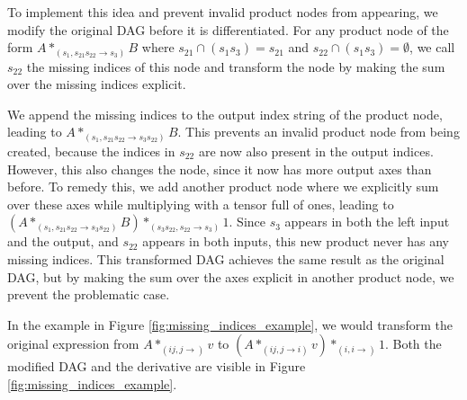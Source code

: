 \documentclass[12pt, a4paper]{report}
\begin{document}
To implement this idea and prevent invalid product nodes from appearing, we modify the original DAG before it is differentiated.
For any product node of the form $A *_{(s_1, s_{21} s_{22} \rightarrow s_3)} B$ where $s_{21} \cap (s_1 s_3) = s_{21}$ and $s_{22} \cap (s_1 s_3) = \emptyset$, we call $s_{22}$ the missing indices of this node and transform the node by making the sum over the missing indices explicit.

We append the missing indices to the output index string of the product node, leading to $A *_{(s_1, s_{21} s_{22} \rightarrow s_3 s_{22})} B$.
This prevents an invalid product node from being created, because the indices in $s_{22}$ are now also present in the output indices.
However, this also changes the node, since it now has more output axes than before.
To remedy this, we add another product node where we explicitly sum over these axes while multiplying with a tensor full of ones, leading to $(A *_{(s_1, s_{21} s_{22} \rightarrow s_3 s_{22})} B) *_{(s_3 s_{22}, s_{22} \rightarrow s_3)} 1$.
Since $s_3$ appears in both the left input and the output, and $s_{22}$ appears in both inputs, this new product never has any missing indices.
This transformed DAG achieves the same result as the original DAG, but by making the sum over the axes explicit in another product node, we prevent the problematic case.

In the example in Figure \ref{fig:missing_indices_example}, we would transform the original expression from $A *_{(ij,j \rightarrow )} v$ to $(A *_{(ij,j \rightarrow i)} v) *_{(i,i \rightarrow)} 1$.
Both the modified DAG and the derivative are visible in Figure \ref{fig:missing_indices_example}.
\end{document}
